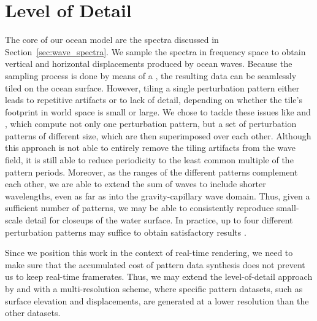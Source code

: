 \section{Level of Detail}
\label{sec:level_of_detail}
The core of our ocean model are the spectra discussed in 
Section~\ref{sec:wave_spectra}. We sample the spectra in 
frequency space to obtain vertical and horizontal displacements produced by 
ocean waves. Because the sampling process is done by means of a \DiscreteFourierTransform,
the resulting data can be seamlessly tiled on the ocean surface. 
However, tiling a single perturbation pattern either leads to repetitive 
artifacts or to lack of detail, depending on whether the tile's footprint in
world space is small or large. We chose to tackle these 
issues like \citet{misc:oceanlightingfft} and \citet{article:whitecaps},
which compute not only one perturbation pattern, but a set of perturbation
patterns of different size, which are then superimposed over each other.
Although this approach is not able to entirely remove the tiling artifacts from
the wave field, it is still able to reduce periodicity to the least common
multiple of the pattern periods.
Moreover, as the \wavenumber ranges of the different patterns complement each
other, we are able to extend the sum of waves to include shorter wavelengths,
even as far as into the gravity-capillary wave domain.
Thus, given a sufficient number of patterns,
we may be able to consistently reproduce small-scale detail for closeups of the
water surface.
In practice, up to four different perturbation patterns may suffice to obtain
satisfactory results \citep{article:whitecaps}.

Since we position this work in the context of real-time rendering,
we need to make sure that the accumulated cost of pattern data synthesis
does not prevent us to keep real-time framerates. 
Thus, we may extend the level-of-detail approach by \citet{misc:oceanlightingfft} and
\citet{article:whitecaps} with a multi-resolution scheme, where
specific pattern
datasets, such as surface elevation and displacements, are generated at a lower
resolution than the other datasets. 

